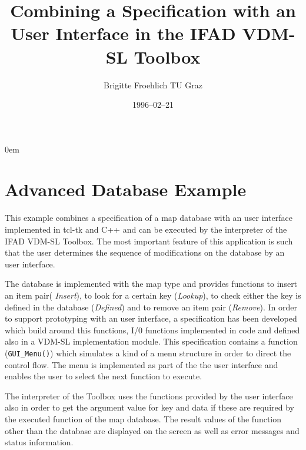 \parindent 0em 

\title{ Combining a Specification with an User Interface in the
IFAD VDM-SL Toolbox}
\author{Brigitte Froehlich  TU Graz}
\date{1996--02--21}
\maketitle

\section{Advanced Database Example}
This example combines a specification of a map database with an
user interface implemented in tcl-tk and C++ and can be executed by
the interpreter of the IFAD VDM-SL Toolbox. The most important feature 
of this application is such that the user determines the sequence of 
modifications on the database by an user interface. 

The database is implemented with the map type and provides functions
to insert an item pair( {\sl Insert}), to look for a certain key
({\sl Lookup}), to check either the key is defined in the database 
({\sl Defined}) and to remove an item pair ({\sl Remove}). 
In order to support prototyping with an user interface,
a specification has been developed which build around this functions,
I/0 functions implemented in code and defined also in a VDM-SL
implementation module. This specification  contains a function 
({\tt GUI\_Menu()}) which simulates a kind of a menu structure in order 
to direct the control flow. The menu is implemented as part of the the user 
interface and  enables the user to select the next function to execute. 

The interpreter of the Toolbox uses the functions provided by the user 
interface also in order to get the argument value for key and data 
if these are required by the executed function of the map database. 
The result values of the function other than the database are displayed  
on the screen as well as error messages and status information.

